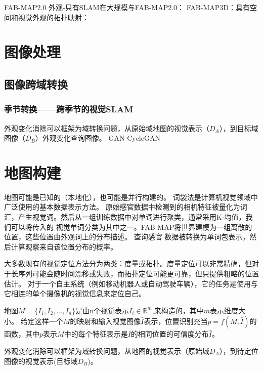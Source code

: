 FAB-MAP2.0\cite{Cummins2011Appearance}
外观-只有SLAM在大规模与FAB-MAP2.0：\cite{Cummins2011Appearance}
FAB-MAP3D：具有空间和视觉外观的拓扑映射：\cite{Paul2010FAB}

\section{图像处理}
\label{sec:preprocessing}
\subsection{图像跨域转换}
\subsubsection{季节转换——跨季节的视觉SLAM}
外观变化消除可以框架为域转换问题，从原始域地图的视觉表示（$D_A$），到目标域图像（$D_B$）外观变化查询图像。
GAN\cite{latif2017addressing}
CycleGAN\cite{zhu2017unpaired}

\section{地图构建}
\label{sec:map}
地图可能是已知的（本地化），也可能是并行构建的。 词袋法是计算机视觉领域中广泛使用的基本数据表示方法\cite{Sivic2003Video}。
原始感官数据中检测到的相机特征被量化为词汇，产生视觉词。然后从一组训练数据中对单词进行聚类，通常采用K-均值，我们可以将传入的
视觉单词分类为其中之一。FAB-MAP\cite{Cummins2008FAB}将世界建模为一组离散的位置，这些位置由外观词上的分布描述。 查询感官
数据被转换为单词包表示，然后计算观察来自该位置分布的概率。

大多数现有的视觉定位方法分为两类：度量或拓扑。度量定位可以非常精确，但对于长序列可能会随时间漂移或失败，而拓扑定位可能更可靠，但只提供粗略的位置估计。 
对于一个自主系统（例如移动机器人或自动驾驶车辆），它的任务是使用与它相连的单个摄像机的视觉信息来定位自己。

地图$M = \{I_1, I_2, ..., I_n\}$是由n个视觉表示$I_i \in \mathbb{R}^m $,来构造的，其中$m$表示维度大小。 给定这样一个$M$的映射和输入视觉图像$\hat{I}$表示，位置识别充当$p = f(M, \hat{I})$的函数，其中$p$表示$M$中的每个特征表示是${I}$的相同位置的可信度分布$\hat{I}$。

外观变化消除可以框架为域转换问题，从地图的视觉表示（原始域$D_A$），到待定位图像的视觉表示(目标域$D_B$)。

